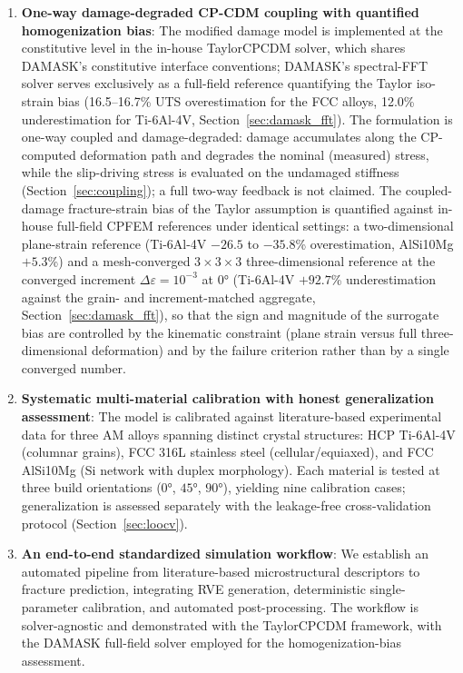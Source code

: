 \documentclass[12pt,a4paper,twocolumn]{article}
\begin{document}
\begin{enumerate}
    \item \textbf{One-way damage-degraded CP-CDM coupling with quantified homogenization bias}: The modified damage model is implemented at the constitutive level in the in-house TaylorCPCDM solver, which shares DAMASK's constitutive interface conventions; DAMASK's spectral-FFT solver serves exclusively as a full-field reference quantifying the Taylor iso-strain bias (16.5--16.7\% UTS overestimation for the FCC alloys, 12.0\% underestimation for Ti-6Al-4V, Section~\ref{sec:damask_fft}). The formulation is one-way coupled and damage-degraded: damage accumulates along the CP-computed deformation path and degrades the nominal (measured) stress, while the slip-driving stress is evaluated on the undamaged stiffness (Section~\ref{sec:coupling}); a full two-way feedback is not claimed. The coupled-damage fracture-strain bias of the Taylor assumption is quantified against in-house full-field CPFEM references under identical settings: a two-dimensional plane-strain reference (Ti-6Al-4V $-26.5$ to $-35.8$\% overestimation, AlSi10Mg $+5.3$\%) and a mesh-converged $3\times3\times3$ three-dimensional reference at the converged increment $\Delta\varepsilon=10^{-3}$ at $\ang{0}$ (Ti-6Al-4V $+92.7$\% underestimation against the grain- and increment-matched aggregate, Section~\ref{sec:damask_fft}), so that the sign and magnitude of the surrogate bias are controlled by the kinematic constraint (plane strain versus full three-dimensional deformation) and by the failure criterion rather than by a single converged number.
    
    \item \textbf{Systematic multi-material calibration with honest generalization assessment}: The model is calibrated against literature-based experimental data for three AM alloys spanning distinct crystal structures: HCP Ti-6Al-4V (columnar grains), FCC 316L stainless steel (cellular/equiaxed), and FCC AlSi10Mg (Si network with duplex morphology). Each material is tested at three build orientations ($\ang{0}$, $\ang{45}$, $\ang{90}$), yielding nine calibration cases; generalization is assessed separately with the leakage-free cross-validation protocol (Section~\ref{sec:loocv}).
    
    \item \textbf{An end-to-end standardized simulation workflow}: We establish an automated pipeline from literature-based microstructural descriptors to fracture prediction, integrating RVE generation, deterministic single-parameter calibration, and automated post-processing. The workflow is solver-agnostic and demonstrated with the TaylorCPCDM framework, with the DAMASK full-field solver employed for the homogenization-bias assessment.
\end{enumerate}
\end{document}

